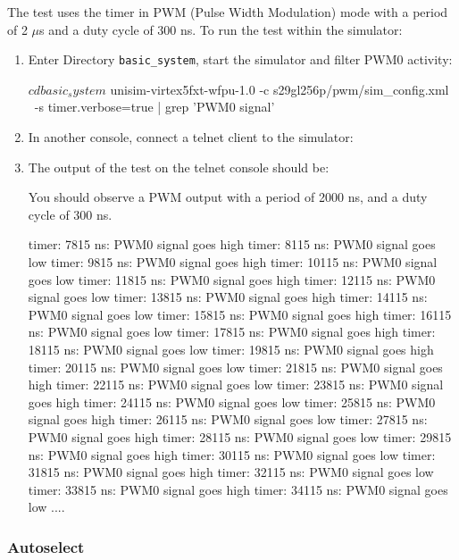 The test uses the timer in PWM (Pulse Width Modulation) mode with a period of 2 $\mu$s and a duty cycle of 300 ns.
\noindent To run the test within the simulator:
\begin{enumerate}

\item Enter Directory \texttt{basic\_system}, start the simulator and filter PWM0 activity:
\begin{script}
$ cd basic_system
$ unisim-virtex5fxt-wfpu-1.0 -c s29gl256p/pwm/sim_config.xml \
                             -s timer.verbose=true | grep 'PWM0 signal'
\end{script}
\item In another console, connect a telnet client to the simulator:
\begin{script}
$ telnet localhost 1234
\end{script}
\item The output of the test on the telnet console should be:
\begin{script}
You should observe a PWM output with a period of 2000 ns, and a duty cycle of 300 ns.
\end{script}
\begin{script}
timer: 7815 ns: PWM0 signal goes high
timer: 8115 ns: PWM0 signal goes low
timer: 9815 ns: PWM0 signal goes high
timer: 10115 ns: PWM0 signal goes low
timer: 11815 ns: PWM0 signal goes high
timer: 12115 ns: PWM0 signal goes low
timer: 13815 ns: PWM0 signal goes high
timer: 14115 ns: PWM0 signal goes low
timer: 15815 ns: PWM0 signal goes high
timer: 16115 ns: PWM0 signal goes low
timer: 17815 ns: PWM0 signal goes high
timer: 18115 ns: PWM0 signal goes low
timer: 19815 ns: PWM0 signal goes high
timer: 20115 ns: PWM0 signal goes low
timer: 21815 ns: PWM0 signal goes high
timer: 22115 ns: PWM0 signal goes low
timer: 23815 ns: PWM0 signal goes high
timer: 24115 ns: PWM0 signal goes low
timer: 25815 ns: PWM0 signal goes high
timer: 26115 ns: PWM0 signal goes low
timer: 27815 ns: PWM0 signal goes high
timer: 28115 ns: PWM0 signal goes low
timer: 29815 ns: PWM0 signal goes high
timer: 30115 ns: PWM0 signal goes low
timer: 31815 ns: PWM0 signal goes high
timer: 32115 ns: PWM0 signal goes low
timer: 33815 ns: PWM0 signal goes high
timer: 34115 ns: PWM0 signal goes low
....
\end{script}
\end{enumerate}

\subsubsection{Autoselect}

